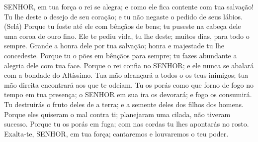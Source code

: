 
{\PP 
  SENHOR, em tua força o rei se alegra; e como ele fica contente com tua salvação!
  Tu lhe deste o desejo de seu coração; e tu não negaste o pedido de seus lábios. (Selá)
  Porque tu foste até ele com bênçãos de bens; tu puseste na cabeça dele uma coroa de ouro fino.
  Ele te pediu vida,
{} tu lhe deste; muitos dias, para todo o sempre.
  Grande
{} a honra dele por tua salvação; honra e majestade tu lhe concedeste.
  Porque tu o pões em bênçãos para sempre; tu fazes abundante a alegria dele com tua face.
  Porque o rei confia no SENHOR; e ele nunca se abalará com a bondade do Altíssimo.
  Tua mão alcançará a todos o os teus inimigos; tua mão direita encontrará aos que te odeiam.
  Tu os porás como que
{} forno de fogo no tempo
{} em tua presença; o SENHOR em sua ira os devorará; e fogo os consumirá.
  Tu destruirás o fruto deles de
{} a terra; e
{} a semente deles dos filhos dos homens.
  Porque eles quiseram o mal contra ti; planejaram uma cilada,
{} não tiveram sucesso.
  Porque tu os porás em fuga; com
{} nas cordas tu lhes apontarás no rosto.
  Exalta-te, SENHOR, em tua força; cantaremos e louvaremos o teu poder.
\par }


